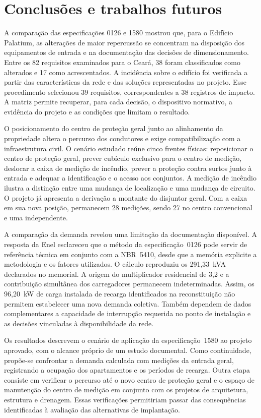 \chapter{Conclusões e trabalhos futuros}
\label{cap:conclusoes}

A comparação das especificações 0126 e 1580 mostrou que, para o Edifício Palatium, as alterações de maior repercussão se concentram na disposição dos equipamentos de entrada e na documentação das decisões de dimensionamento. Entre os 82 requisitos examinados para o Ceará, 38 foram classificados como alterados e 17 como acrescentados. A incidência sobre o edifício foi verificada a partir das características da rede e das soluções representadas no projeto. Esse procedimento selecionou 39 requisitos, correspondentes a 38 registros de impacto. A matriz permite recuperar, para cada decisão, o dispositivo normativo, a evidência do projeto e as condições que limitam o resultado.

O posicionamento do centro de proteção geral junto ao alinhamento da propriedade altera o percurso dos condutores e exige compatibilização com a infraestrutura civil. O cenário estudado reúne cinco frentes físicas: reposicionar o centro de proteção geral, prever cubículo exclusivo para o centro de medição, deslocar a caixa de medição de incêndio, prever a proteção contra surtos junto à entrada e adequar a identificação e o acesso aos conjuntos. A medição de incêndio ilustra a distinção entre uma mudança de localização e uma mudança de circuito. O projeto já apresenta a derivação a montante do disjuntor geral. Com a caixa em sua nova posição, permanecem 28 medições, sendo 27 no centro convencional e uma independente.

A comparação da demanda revelou uma limitação da documentação disponível. A resposta da Enel esclareceu que o método da especificação~0126 pode servir de referência técnica em conjunto com a NBR~5410, desde que a memória explicite a metodologia e os fatores utilizados. O cálculo reproduziu os 291,33~kVA declarados no memorial. A origem do multiplicador residencial de 3,2 e a contribuição simultânea dos carregadores permanecem indeterminadas. Assim, os 96,20~kW de carga instalada de recarga identificados na reconstituição não permitem estabelecer uma nova demanda coletiva. Também dependem de dados complementares a capacidade de interrupção requerida no ponto de instalação e as decisões vinculadas à disponibilidade da rede.

Os resultados descrevem o cenário de aplicação da especificação~1580 ao projeto aprovado, com o alcance próprio de um estudo documental. Como continuidade, propõe-se confrontar a demanda calculada com medições da entrada geral, registrando a ocupação dos apartamentos e os períodos de recarga. Outra etapa consiste em verificar o percurso até o novo centro de proteção geral e o espaço de manutenção do centro de medição em conjunto com os projetos de arquitetura, estrutura e drenagem. Essas verificações permitiriam passar das consequências identificadas à avaliação das alternativas de implantação.
